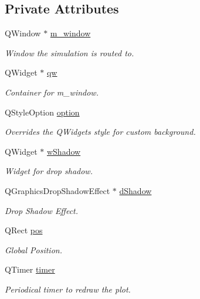 \subsection*{Private Attributes}
\begin{DoxyCompactItemize}
\item 
Q\+Window $\ast$ \mbox{\hyperlink{classPaint_a12c0d1f2f57bd3aea9388f42aa6434f8}{m\+\_\+window}}
\begin{DoxyCompactList}\small\item\em Window the simulation is routed to. \end{DoxyCompactList}\item 
Q\+Widget $\ast$ \mbox{\hyperlink{classPaint_abaab9ddb4a329f78b558793a5f3a84c3}{qw}}
\begin{DoxyCompactList}\small\item\em Container for m\+\_\+window. \end{DoxyCompactList}\item 
Q\+Style\+Option \mbox{\hyperlink{classPaint_ac0f5a8dc0d272705bd7251867e8eabf2}{option}}
\begin{DoxyCompactList}\small\item\em Overrides the Q\+Widget\textquotesingle{}s style for custom background. \end{DoxyCompactList}\item 
Q\+Widget $\ast$ \mbox{\hyperlink{classPaint_a6263fca255c858e9cbf7f549392b9e9e}{w\+Shadow}}
\begin{DoxyCompactList}\small\item\em Widget for drop shadow. \end{DoxyCompactList}\item 
Q\+Graphics\+Drop\+Shadow\+Effect $\ast$ \mbox{\hyperlink{classPaint_adc5781ac10ec78958b8818b46a096914}{d\+Shadow}}
\begin{DoxyCompactList}\small\item\em Drop Shadow Effect. \end{DoxyCompactList}\item 
Q\+Rect \mbox{\hyperlink{classPaint_ad18245bd858cc8c6bd715e56659e3634}{pos}}
\begin{DoxyCompactList}\small\item\em Global Position. \end{DoxyCompactList}\item 
Q\+Timer \mbox{\hyperlink{classPaint_a0cd2955c474cb99795506bdee2df71ab}{timer}}
\begin{DoxyCompactList}\small\item\em Periodical timer to redraw the plot. \end{DoxyCompactList}\item 

\end{DoxyCompactItemize}
